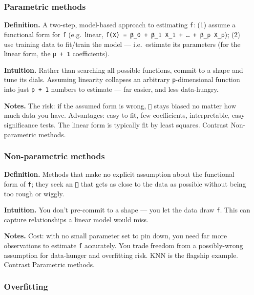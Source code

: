 \documentclass[
  10pt,
  letterpaper,
  onecolumn]{article}
\begin{document}
\hypertarget{parametric-methods}{%
\subsubsection{Parametric methods}\label{parametric-methods}}

\textbf{Definition.} A two-step, model-based approach to estimating
\texttt{f}: (1) assume a functional form for \texttt{f} (e.g.~linear,
\texttt{f(X)\ =\ β\_0\ +\ β\_1\ X\_1\ +\ …\ +\ β\_p\ X\_p}); (2) use
training data to fit/train the model --- i.e.~estimate its parameters
(for the linear form, the \texttt{p\ +\ 1} coefficients).

\textbf{Intuition.} Rather than searching all possible functions, commit
to a shape and tune its dials. Assuming linearity collapses an arbitrary
\texttt{p}-dimensional function into just \texttt{p\ +\ 1} numbers to
estimate --- far easier, and less data-hungry.

\textbf{Notes.} The risk: if the assumed form is wrong, \texttt{} stays
biased no matter how much data you have. Advantages: easy to fit, few
coefficients, interpretable, easy significance tests. The linear form is
typically fit by least squares. Contrast Non-parametric methods.

\hypertarget{non-parametric-methods}{%
\subsubsection{Non-parametric methods}\label{non-parametric-methods}}

\textbf{Definition.} Methods that make no explicit assumption about the
functional form of \texttt{f}; they seek an \texttt{} that gets as
close to the data as possible without being too rough or wiggly.

\textbf{Intuition.} You don't pre-commit to a shape --- you let the data
draw \texttt{f}. This can capture relationships a linear model would
miss.

\textbf{Notes.} Cost: with no small parameter set to pin down, you need
far more observations to estimate \texttt{f} accurately. You trade
freedom from a possibly-wrong assumption for data-hunger and overfitting
risk. KNN is the flagship example. Contrast Parametric methods.

\hypertarget{overfitting}{%
\subsubsection{Overfitting}\label{overfitting}}
\end{document}
